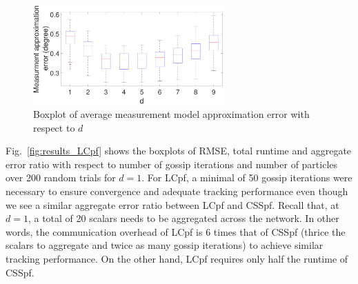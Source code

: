 \documentclass[10pt,letterpaper,final]{article}
\begin{document}
\begin{figure}
\centering
\includegraphics[width=0.65\textwidth]{Figures/boxplot_LCpf_mea_approx_error_maxDegree}
\caption{Boxplot of average measurement model approximation error with respect to $d$}
\label{fig:boxplot_LCpf_meas_approx_error}
\end{figure}

Fig.~\ref{fig:results_LCpf} shows the boxplots of RMSE, total runtime and aggregate error ratio with respect to number of gossip iterations and number of particles over 200 random trials for $d=1$. For LCpf, a minimal of 50 gossip iterations were necessary to ensure convergence and adequate tracking performance even though we see a similar aggregate error ratio between LCpf and CSSpf.  Recall that, at $d=1$, a total of 20 scalars needs to be aggregated across the network. In other words, the communication overhead of LCpf is 6 times that of CSSpf (thrice the scalars to aggregate and twice as many gossip iterations) to achieve similar tracking performance. On the other hand, LCpf requires only half the runtime of CSSpf. 
\end{document}
